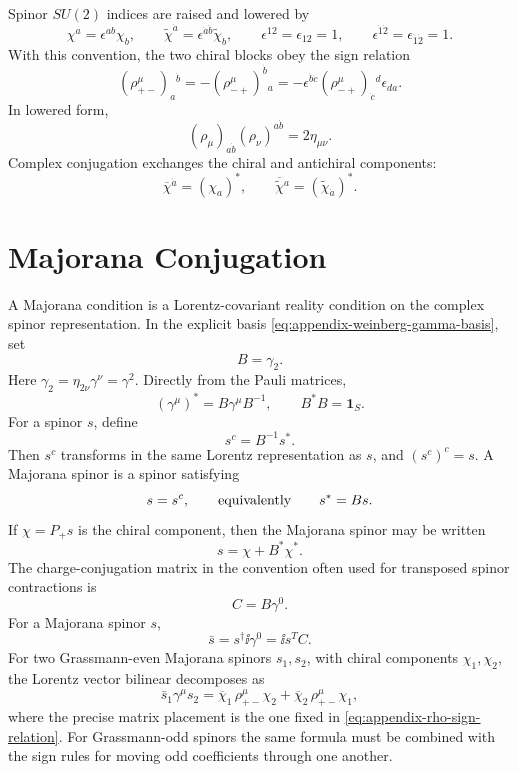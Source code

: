 Spinor \(SU(2)\) indices are raised and lowered by
\[
  \chi^a=\epsilon^{ab}\chi_b,
  \qquad
  \widetilde\chi^{\dot a}
  =
  \epsilon^{\dot a\dot b}\widetilde\chi_{\dot b},
  \qquad
  \epsilon^{12}=\epsilon_{12}=1,
  \qquad
  \epsilon^{\dot1\dot2}=\epsilon_{\dot1\dot2}=1 .
\]
With this convention, the two chiral blocks obey the sign relation
\begin{equation}
  (\rho^\mu_{+-})_a{}^{\dot b}
  =
  -(\rho^\mu_{-+})^{\dot b}{}_a
  =
  -\epsilon^{\dot b\dot c}
  (\rho^\mu_{-+})_{\dot c}{}^d
  \epsilon_{da}.
  \label{eq:appendix-rho-sign-relation}
\end{equation}
In lowered form,
\[
  (\rho_\mu)_{a\dot b}(\rho_\nu)^{a\dot b}
  =
  2\eta_{\mu\nu}.
\]
Complex conjugation exchanges the chiral and antichiral components:
\[
  \overline\chi{}^{\dot a}=(\chi_a)^*,
  \qquad
  \overline{\widetilde\chi}{}^{a}
  =
  (\widetilde\chi_{\dot a})^* .
\]

\section{Majorana Conjugation}

A Majorana condition is a Lorentz-covariant reality condition on the complex
spinor representation.  In the explicit basis
\eqref{eq:appendix-weinberg-gamma-basis}, set
\begin{equation}
  B=\gamma_2 .
  \label{eq:appendix-majorana-B}
\end{equation}
Here \(\gamma_2=\eta_{2\nu}\gamma^\nu=\gamma^2\).  Directly from the Pauli
matrices,
\[
  (\gamma^\mu)^*=B\gamma^\mu B^{-1},
  \qquad
  B^*B=\mathbf 1_S .
\]
For a spinor \(s\), define
\[
  s^c=B^{-1}s^* .
\]
Then \(s^c\) transforms in the same Lorentz representation as \(s\), and
\((s^c)^c=s\).  A Majorana spinor is a spinor satisfying
\[
  s=s^c,
  \qquad\hbox{equivalently}\qquad
  s^*=Bs .
\]
If \(\chi=P_+s\) is the chiral component, then the Majorana spinor may be
written
\[
  s=\chi+B^*\chi^* .
\]
The charge-conjugation matrix in the convention often used for transposed
spinor contractions is
\[
  C=B\gamma^0 .
\]
For a Majorana spinor \(s\),
\[
  \bar s=s^\dagger\ii\gamma^0
  =
  \ii s^T C .
\]
For two Grassmann-even Majorana spinors \(s_1,s_2\), with chiral components
\(\chi_1,\chi_2\), the Lorentz vector bilinear decomposes as
\[
  \bar s_1\gamma^\mu s_2
  =
  \overline\chi_1\,\rho^\mu_{+-}\chi_2
  +
  \overline\chi_2\,\rho^\mu_{+-}\chi_1,
\]
where the precise matrix placement is the one fixed in
\eqref{eq:appendix-rho-sign-relation}.  For Grassmann-odd spinors the same
formula must be combined with the sign rules for moving odd coefficients
through one another.

